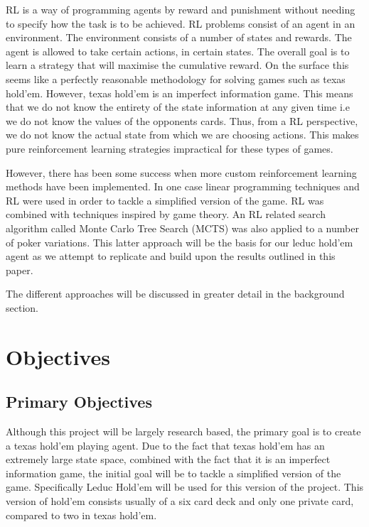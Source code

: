 RL is a way of programming agents by reward and punishment without needing to specify how the
task is to be achieved\citep{kaelbling1996reinforcement}.
RL problems consist of an agent in an environment.
The environment consists of a number of states and rewards.
The agent is allowed to take certain actions, in certain states.
The overall goal is to learn a strategy that will maximise the cumulative reward.
On the surface this seems like a perfectly reasonable methodology for solving games such as texas hold'em.
However, texas hold'em is an imperfect information game.
This means that we do not know the entirety of the state information at any given time
i.e we do not know the values of the opponents cards.
Thus, from a RL perspective, we do not know the actual state from which we are choosing actions.
This makes pure reinforcement learning strategies impractical for these types of games.

However, there has been some success when more custom reinforcement learning methods have been implemented.
In one case linear programming techniques and RL were used in order to tackle a
simplified version of the game\citep{dahl2001reinforcement}.
RL was combined with techniques inspired by game theory\citep{heinrich2015fictitious}.
An RL related search algorithm called Monte Carlo Tree Search (MCTS) was also applied to a
number of poker variations\citep{heinrich2017reinforcement}.
This latter approach will be the basis for our leduc hold'em agent as we attempt to replicate and
build upon the results outlined in this paper.

The different approaches will be discussed in greater detail in the background section.

\section{Objectives}\label{sec:objectives}
\subsection{Primary Objectives}\label{subsec:primaryObjectives}

Although this project will be largely research based, the primary goal is to create a texas hold'em
playing agent.
Due to the fact that texas hold'em has an extremely large state space, combined with the fact that it
is an imperfect information game, the initial goal will be to tackle a simplified version of the game.
Specifically Leduc Hold'em will be used for this version of the project.
This version of hold'em consists usually of a six card deck and only one private card, compared to two in texas hold'em.

